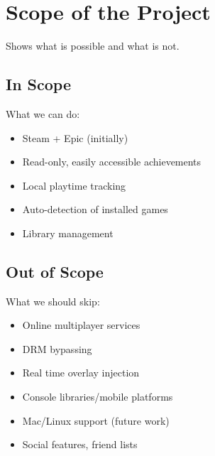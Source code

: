 \section{Scope of the Project}
Shows what is possible and what is not.

\subsection{In Scope}
What we can do:

\begin{itemize}
  \item Steam + Epic (initially)
  \item Read-only, easily accessible achievements
  \item Local playtime tracking
  \item Auto-detection of installed games
  \item Library management
\end{itemize}

\subsection{Out of Scope}
What we should skip:

\begin{itemize}
  \item Online multiplayer services
  \item DRM bypassing
  \item Real time overlay injection
  \item Console libraries/mobile platforms
  \item Mac/Linux support (future work)
  \item Social features, friend lists
\end{itemize}


